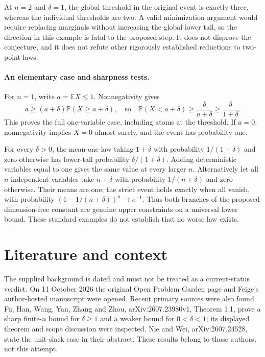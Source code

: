 \documentclass[11pt,a4paper]{article}
\begin{document}
At $n=2$ and $\delta=1$, the global threshold in the original event is exactly three, whereas the individual thresholds are two. A valid minimization argument would require replacing marginals without increasing the global lower tail, so the direction in this example is fatal to the proposed step. It does not disprove the conjecture, and it does not refute other rigorously established reductions to two-point laws.

\paragraph{An elementary case and sharpness tests.}
For $n=1$, write $a=\mathbb EX\le1$. Nonnegativity gives
\[
 a\ge(a+\delta)\mathbb P(X\ge a+\delta),
 \quad\text{so}\quad
 \mathbb P(X<a+\delta)\ge\frac\delta{a+\delta}
 \ge\frac\delta{1+\delta}.
\]
This proves the full one-variable case, including atoms at the threshold. If $a=0$, nonnegativity implies $X=0$ almost surely, and the event has probability one.

For every $\delta>0$, the mean-one law taking $1+\delta$ with probability $1/(1+\delta)$ and zero otherwise has lower-tail probability $\delta/(1+\delta)$. Adding deterministic variables equal to one gives the same value at every larger $n$. Alternatively let all $n$ independent variables take $n+\delta$ with probability $1/(n+\delta)$ and zero otherwise. Their means are one; the strict event holds exactly when all vanish, with probability $(1-1/(n+\delta))^n\to e^{-1}$. Thus both branches of the proposed dimension-free constant are genuine upper constraints on a universal lower bound. These standard examples do not establish that no worse law exists.

\section{Literature and context}
The supplied background is dated and must not be treated as a current-status verdict. On 11 October 2026 the original Open Problem Garden page and Feige's author-hosted manuscript were opened. Recent primary sources were also found. Fu, Han, Wang, Yan, Zhang and Zhou, arXiv:2607.23980v1, Theorem 1.1, prove a sharp finite-$n$ bound for $\delta\ge1$ and a weaker bound for $0<\delta<1$; its displayed theorem and scope discussion were inspected. Nie and Wei, arXiv:2607.24528, state the unit-slack case in their abstract. These results belong to those authors, not this attempt.
\end{document}
